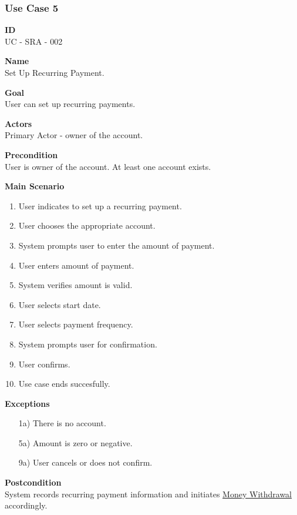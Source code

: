 \documentclass[12pt]{article}
\begin{document}
\subsubsection{Use Case 5} \label{uc:5}

\noindent
{\bf ID}\\
UC - SRA - 002

\noindent
{\bf Name}\\
Set Up Recurring Payment.

\noindent
{\bf Goal}\\
User can set up recurring payments.

\noindent
{\bf Actors}\\
Primary Actor - owner of the account.

\noindent
{\bf Precondition}\\
User is owner of the account.
At least one account exists.

\noindent
{\bf Main Scenario}\\
\vspace*{-0.2in}
\begin{enumerate}
  \item User indicates to set up a recurring payment.
  \item User chooses the appropriate account.
  \item System prompts user to enter the amount of payment.
  \item User enters amount of payment.
  \item System verifies amount is valid.
  \item User selects start date.
  \item User selects payment frequency.
  \item System prompts user for confirmation.
  \item User confirms.
  \item Use case ends succesfully.
\end{enumerate}

\noindent
    {\bf Exceptions}\\
    \vspace{-0.2in}
    \begin{itemize}
    \item[1a)] There is no account.
    \item[5a)] Amount is zero or negative.
    \item[9a)] User cancels or does not confirm.
    \end{itemize}

\noindent
{\bf Postcondition}\\
System records recurring payment information and initiates \underline{Money Withdrawal} accordingly.
\end{document}
